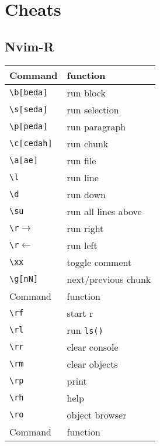 \documentclass[a4paper]{article}
\newcommand{\rcmd}[1]{\texttt{\textbackslash #1}}
\begin{document}
\section*{Cheats}

\begin{minipage}[t]{0.33\textwidth}
  \subsection*{Nvim-R}
  \begin{tabular}{l l}
    \toprule
    Command               & function            \\
    \midrule
    \rcmd{b[beda]}        & run block           \\
    \rcmd{s[seda]}        & run selection       \\
    \rcmd{p[peda]}        & run paragraph       \\
    \rcmd{c[cedah]}       & run chunk           \\
    \rcmd{a[ae]}          & run file            \\
    \rcmd{l}              & run line            \\
    \rcmd{d}              & run down            \\
    \rcmd{su}             & run all lines above \\
    \rcmd{r$\rightarrow$} & run right           \\
    \rcmd{r$\leftarrow$}  & run left            \\
    \rcmd{xx}             & toggle comment      \\
    \rcmd{g[nN]}          & next/previous chunk \\
    \midrule
    \midrule
    Command               & function            \\
    \midrule
    \rcmd{rf}             & start r             \\
    \rcmd{rl}             & run \texttt{ls()}   \\
    \rcmd{rr}             & clear console       \\
    \rcmd{rm}             & clear objects       \\
    \rcmd{rp}             & print               \\
    \rcmd{rh}             & help                \\
    \rcmd{ro}             & object browser      \\
    \midrule
    \midrule
    Command               & function            \\

\end{tabular}
\end{minipage}
\end{document}

